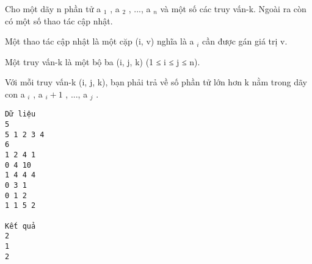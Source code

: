 Cho một dãy n phần tử a   $_    1   $   ,   a   $_    2   $   , ..., a   $_    n   $   và một số các truy vấn-k. Ngoài ra còn có một số thao tác cập nhật.  

   Một thao tác cập nhật là một cặp (i, v) nghĩa là a   $_    i   $   cần được gán giá trị v.  

   Một truy vấn-k là một bộ ba (i, j, k) (1 ≤ i ≤ j ≤ n).  

   Với mỗi truy vấn-k (i, j, k), bạn phải trả về số phần tử lớn hơn k nằm trong dãy con a   $_    i   $   ,   a   $_    i+1   $   , ..., a   $_    j   $   .
\begin{verbatim}
Dữ liệu
5
5 1 2 3 4
6
1 2 4 1
0 4 10
1 4 4 4
0 3 1
0 1 2
1 1 5 2  

Kết quả
2
1
2 
\end{verbatim}